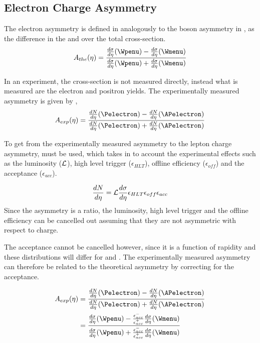 \subsection{Electron Charge Asymmetry}

The electron asymmetry is defined in  analogously to the
\PW boson asymmetry in , as the difference in the
\HepProcess{\PWplus \to \APelectron} and \HepProcess{\PWminus \to \Pelectron}
over the total \inclusiveWe cross-section.
\begin{equation}
A_{the}(\eta)=\frac{  \frac{d\sigma}{d\eta}(\Wpenu) -
\frac{d\sigma}{d\eta}(\Wmenu) }{ \frac{d\sigma}{d\eta}(\Wpenu) +
\frac{d\sigma}{d\eta}(\Wmenu) }
\label{eq:AsymThe}
\end{equation} 

In an experiment, the cross-section is not measured directly, instead what is
measured are the electron and positron yields.  The experimentally measured
asymmetry is given by ,
\begin{equation}
A_{exp}(\eta)=\frac{  \frac{dN}{d\eta}(\Pelectron) -
\frac{dN}{d\eta}(\APelectron) }{ \frac{dN}{d\eta}(\Pelectron) +
\frac{dN}{d\eta}(\APelectron) }
\label{eq:AsymExp}
\end{equation} 

To get from the experimentally measured asymmetry to the lepton charge
asymmetry,  must be used, which takes in to
account the experimental effects such as the luminosity (${\cal L}$), high
level trigger ($\epsilon_{HLT}$), offline efficiency ($ \epsilon_{off}$) and
the acceptance ($\epsilon_{acc}$).

\begin{equation}
\frac{dN}{d\eta} = {\cal L } \frac{d\sigma}{d\eta}  \epsilon_{HLT}
\epsilon_{off} \epsilon_{acc}
\label{eq:NumEve}
\end{equation} 
Since the asymmetry is a ratio, the luminosity, high level trigger and the
offline efficiency can be cancelled out assuming that they are not asymmetric
with respect to charge. 

The acceptance cannot be cancelled however, since it is a function of rapidity and 
these distributions will differ for \Pelectron and \APelectron.
The experimentally measured asymmetry can therefore be related to the
theoretical asymmetry by correcting for the acceptance.

\begin{align} 
A_{exp}(\eta) &= \frac{ \frac{dN}{d\eta}(\Pelectron) -
\frac{dN}{d\eta}(\APelectron) }{ \frac{dN}{d\eta}(\Pelectron) +
\frac{dN}{d\eta}(\APelectron) }\\   
              &= \frac{ \frac{d\sigma}{d\eta}(\Wpenu) -
\frac{\epsilon^{-}_{acc}}{\epsilon^{+}_{acc}} \frac{d\sigma}{d\eta}(\Wmenu) }{
\frac{d\sigma}{d\eta}(\Wpenu) + \frac{\epsilon^{-}_{acc}}{\epsilon^{+}_{acc}}
\frac{d\sigma}{d\eta}(\Wmenu) }
\label{eq:AsymExpCorr}
\end{align}

